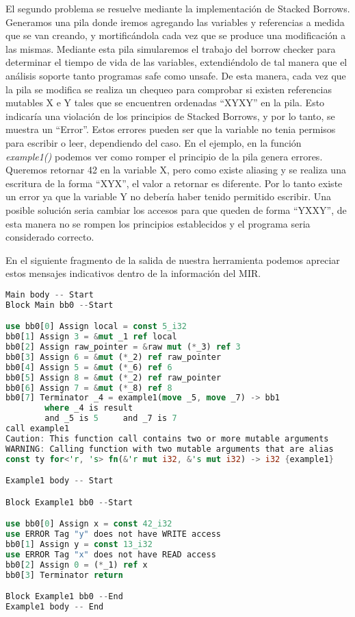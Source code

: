 El segundo problema se resuelve mediante la implementación de Stacked Borrows. Generamos una pila donde iremos agregando las variables y referencias a medida que se van creando, y mortificándola cada vez que se produce una modificación a las mismas. Mediante esta pila simularemos el trabajo del borrow checker para determinar el tiempo de vida de las variables, extendiéndolo de tal manera que el análisis soporte tanto programas safe como unsafe.
De esta manera, cada vez que la pila se modifica se realiza un chequeo para comprobar si existen referencias mutables X e Y tales que se encuentren ordenadas ``XYXY'' en la pila. Esto indicaría una violación de los principios de Stacked Borrows, y por lo tanto, se muestra un ``Error''. Estos errores pueden ser que la variable no tenia permisos para escribir o leer, dependiendo del caso. En el ejemplo, en la función \textit{example1()} podemos ver como romper el principio de la pila genera errores. Queremos retornar 42 en la variable X, pero como existe aliasing y se realiza una escritura de la forma ``XYX'', el valor a retornar es diferente. Por lo tanto existe un error ya que la variable Y no debería haber tenido permitido escribir. Una posible solución seria cambiar los accesos para que queden de forma ``YXXY'', de esta manera no se rompen los principios establecidos y el programa seria considerado correcto.

En el siguiente fragmento de la salida de nuestra herramienta podemos apreciar estos mensajes indicativos dentro de la información del MIR.

\begin{lstlisting}[language=Rust]
Main body -- Start
Block Main bb0 --Start

use bb0[0] Assign local = const 5_i32
bb0[1] Assign 3 = &mut _1 ref local
bb0[2] Assign raw_pointer = &raw mut (*_3) ref 3
bb0[3] Assign 6 = &mut (*_2) ref raw_pointer
bb0[4] Assign 5 = &mut (*_6) ref 6
bb0[5] Assign 8 = &mut (*_2) ref raw_pointer
bb0[6] Assign 7 = &mut (*_8) ref 8
bb0[7] Terminator _4 = example1(move _5, move _7) -> bb1
        where _4 is result
        and _5 is 5     and _7 is 7
call example1
Caution: This function call contains two or more mutable arguments
WARNING: Calling function with two mutable arguments that are alias
const ty for<'r, 's> fn(&'r mut i32, &'s mut i32) -> i32 {example1}

Example1 body -- Start

Block Example1 bb0 --Start

use bb0[0] Assign x = const 42_i32
use ERROR Tag "y" does not have WRITE access
bb0[1] Assign y = const 13_i32
use ERROR Tag "x" does not have READ access
bb0[2] Assign 0 = (*_1) ref x
bb0[3] Terminator return

Block Example1 bb0 --End
Example1 body -- End
\end{lstlisting}

